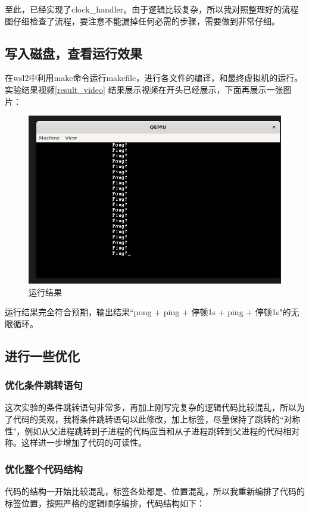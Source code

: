 \documentclass{LabReport}
\begin{document}
	至此，已经实现了clock\_handler。由于逻辑比较复杂，所以我对照整理好的流程图仔细检查了流程，要注意不能漏掉任何必需的步骤，需要做到非常仔细。

	\subsection{写入磁盘，查看运行效果}
	在wsl2中利用make命令运行makefile，进行各文件的编译，和最终虚拟机的运行。实验结果视频\ref{result_video}{\color{red} 结果展示视频}在开头已经展示，下面再展示一张图片：
	
\begin{figure}[h!]
	\centering
	\includegraphics[width=0.7\linewidth]{figures/result}
	\caption{运行结果}
	\label{fig:result}
\end{figure}
	运行结果完全符合预期，输出结果``pong + ping + 停顿1s + ping + 停顿1s"的无限循环。
	
	\subsection{进行一些优化}
	\subsubsection{优化条件跳转语句}
	这次实验的条件跳转语句非常多，再加上刚写完复杂的逻辑代码比较混乱，所以为了代码的美观，我将条件跳转语句以此修改，加上标签，尽量保持了跳转的``对称性"，例如从父进程跳转到子进程的代码应当和从子进程跳转到父进程的代码相对称。这样进一步增加了代码的可读性。
	
	\subsubsection{优化整个代码结构}
	代码的结构一开始比较混乱，标签各处都是、位置混乱，所以我重新编排了代码的标签位置，按照严格的逻辑顺序编排，代码结构如下：\newline
	
\end{document}
